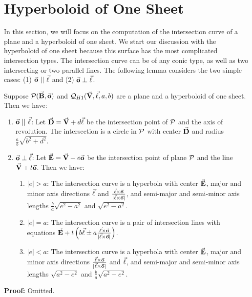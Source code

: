 
\section{Hyperboloid of One Sheet}
\label{section:hy1}

     In this section, we will focus on the computation of the intersection
curve of a plane and a hyperboloid of one sheet.  We start our discussion with
the hyperboloid of one sheet because this surface has the most
complicated intersection types.  The intersection curve can be of any
conic type, as well as two intersecting or two parallel lines.
The following lemma considers the two simple cases:
(1) $\vec{\bf o}\ ||\ \vec{\bf \ell}$ and
(2) $\vec{\bf o}\perp\vec{\bf \ell}$.

\begin{lemma}
\label{lemma:h1-para&perp}
     Suppose ${\cal P}(\vec{\bf B},\vec{\bf o})$ and
${\cal Q}_{H1}(\vec{\bf V},\vec{\bf \ell},a,b)$ are a plane and a hyperboloid of
one sheet.  Then we have:
\begin{enumerate}
     \item $\vec{\bf o}\ ||\ \vec{\bf \ell}$:
          Let $\vec{\bf D}=\vec{\bf V}+d\vec{\bf \ell}$ be the intersection
          point of ${\cal P}$ and the axis of revolution.
          The intersection
          is a circle in ${\cal P}$ with center $\vec{\bf D}$ and radius
          $\frac{a}{b}\sqrt{b^2+d^2}$.
     \item $\vec{\bf o}\perp\vec{\bf \ell}$: Let $\vec{\bf E}=\vec{\bf V}+e\vec{\bf o}$
       be the intersection point of
          plane ${\cal P}$ and the line $\vec{\bf V}+t\vec{\bf o}$.
          Then we have:
     \begin{enumerate}
          \item $|e|>a$: The intersection curve is a hyperbola with center
               $\vec{\bf E}$, major and minor axis directions $\vec{\bf \ell}$
       and $\frac{\vec{\bf \ell}\times\vec{\bf o}}{|\vec{\bf \ell}\times\vec{\bf o}|}$,
               and semi-major and semi-minor axis lengths
               $\frac{b}{a}\sqrt{e^2-a^2}$ and $\sqrt{e^2-a^2}$.
          \item $|e|=a$: The intersection curve is a pair of intersection lines
               with equations $\vec{\bf E}+t\left(b\vec{\bf \ell}\pm
           a\frac{\vec{\bf \ell}\times\vec{\bf o}}{|\vec{\bf \ell}\times\vec{\bf o}|}
               \right)$.
          \item $|e|<a$: The intersection curve is a hyperbola with center
               $\vec{\bf E}$, major and minor axis directions
         $\frac{\vec{\bf \ell}\times\vec{\bf o}}{|\vec{\bf \ell}\times\vec{\bf o}|}$
               and $\vec{\bf \ell}$, and semi-major and semi-minor axis
               lengths $\sqrt{a^2-e^2}$ and
               $\frac{b}{a}\sqrt{a^2-e^2}$.
     \end{enumerate}
\end{enumerate}
\end{lemma}
{\bf Proof:} Omitted. \QED

